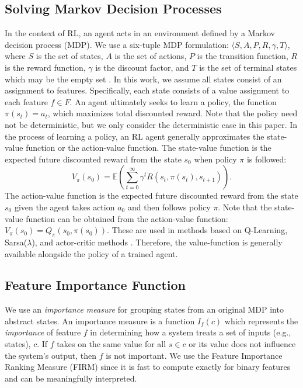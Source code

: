 \documentclass[letterpaper]{article} %
\begin{document}
\subsection{Solving Markov Decision Processes} \label{background_MDPs}
In the context of RL, an agent acts in an environment defined by a Markov decision process (MDP). 
We use a six-tuple MDP formulation: $\langle S, A, P, R, \gamma, T \rangle$, where $S$ is the set of states, $A$ is the set of actions, $P$ is the transition function, $R$ is the reward function, $\gamma$ is the discount factor, and $T$ is the set of terminal states which may be the empty set \cite{SuttonAndBarto}. 
In this work, we assume all states consist of an assignment to features. 
Specifically, each state consists of a value assignment to each feature $f \in F$. 
An agent ultimately seeks to learn a policy, the function $\pi(s_t) = a_t$, which maximizes total discounted reward.
Note that the policy need not be deterministic, but we only consider the deterministic case in this paper. 
In the process of learning a policy, an RL agent generally approximates the state-value function or the action-value function. 
The state-value function is the expected future discounted reward from the state $s_0$ when policy $\pi$ is followed:
\begin{equation} \label{value}
V_{\pi}(s_0) = \mathbb{E} \left( \sum_{t=0}^{\infty} \gamma^t R(s_t, \pi(s_t), s_{t+1} ) \right). 
\end{equation}
The action-value function is the expected future discounted reward from the state $s_0$ given the agent takes action $a_0$ and then follows policy $\pi$.
Note that the state-value function can be obtained from the action-value function: $V_{\pi}(s_0) = Q_{\pi}(s_0, \pi(s_0))$. 
These are used in methods based on Q-Learning, Sarsa($\lambda$), and actor-critic methods \cite{SuttonAndBarto}. 
Therefore, the value-function is generally available alongside the policy of a trained agent. 

\subsection{Feature Importance Function} \label{approach_featureImportanceFunction}
We use an \emph{importance measure} for grouping states from an original MDP into abstract states. 
An importance measure is a function $I_f(c)$ which represents the \emph{importance} of feature $f$ in determining how a system treats a set of inputs (e.g., states), $c$. 
If $f$ takes on the same value for all $s \in c$ or its value does not influence the system's output, then $f$ is not important. 
We use the Feature Importance Ranking Measure (FIRM) \cite{FIRM} since it is fast to compute exactly for binary features and can be meaningfully interpreted. 
\end{document}

